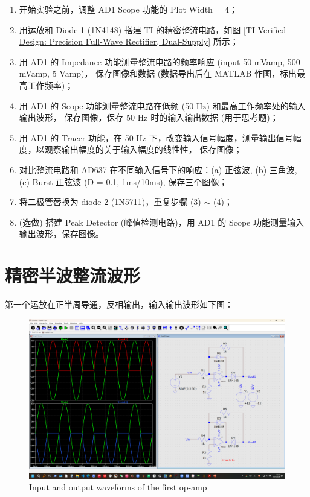 \documentclass[UTF8]{article}
\begin{document}
\begin{enumerate}
\item 开始实验之前，调整 AD1 Scope 功能的 Plot Width = 4；
\item 用运放和 Diode 1 (1N4148) 搭建 TI 的精密整流电路，如图 \ref{TI Verified Design: Precision Full-Wave Rectifier, Dual-Supply} 所示；
\item 用 AD1 的 Impedance 功能测量整流电路的频率响应 (input 50 mVamp, 500 mVamp, 5 Vamp)，{\color{red} 保存图像和数据} (数据导出后在 MATLAB 作图，标出最高工作频率)；
\item 用 AD1 的 Scope 功能测量整流电路在低频 (50 Hz) 和最高工作频率处的输入输出波形，{\color{red} 保存图像，保存 50 Hz 时的输入输出数据 (用于思考题)}；
\item 用 AD1 的 Tracer 功能，在 50 Hz 下，改变输入信号幅度，测量输出信号幅度，以观察输出幅度的关于输入幅度的线性性，{\color{red} 保存图像}；
\item 对比整流电路和 AD637 在不同输入信号下的响应：(a) 正弦波, (b) 三角波, (c) Burst 正弦波 (D = 0.1, 1ms/10ms), {\color{red} 保存三个图像}；
\item 将二极管替换为 diode 2 (1N5711)，重复步骤 (3) $\sim$ (4)；
\item (选做) 搭建 Peak Detector (峰值检测电路)，用 AD1 的 Scope 功能测量输入输出波形，保存图像。
\end{enumerate}

\section{精密半波整流波形}

第一个运放在正半周导通，反相输出，输入输出波形如下图：

\begin{figure}[H]\centering
    \includegraphics[width=\columnwidth]{preview/assets/image copy.png}
    \caption{Input and output waveforms of the first op-amp}
\end{figure}

\end{document}
